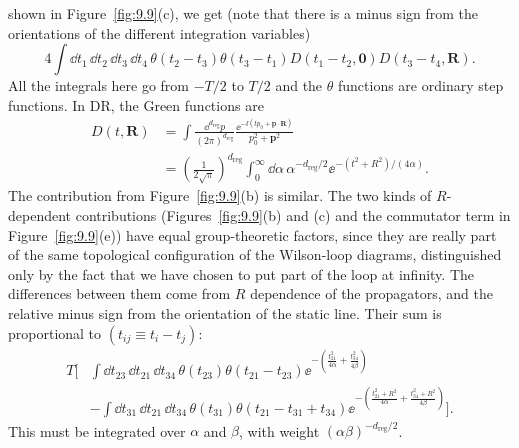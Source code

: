 shown in Figure~\ref{fig:9.9}(c), we get (note that there is a minus sign from
the orientations of the different integration variables)
\[
  4\int\dd t_1\,\dd t_2\,\dd t_3\,\dd t_4\,
  \theta(t_2-t_3)\theta(t_3-t_1)D(t_1-t_2,\mathbf 0)D(t_3-t_4,\mathbf R).
\]
All the integrals here go from $-T/2$ to $T/2$ and the $\theta$ functions are
ordinary step functions. In DR, the Green functions are
\[
\begin{aligned}
  D(t,\mathbf R)&=\int\frac{\dd^{d_{\mathrm{reg}}}p}{(2\pi)^{d_{\mathrm{reg}}}}
  \frac{\ee^{-\ii(tp_0+\mathbf p\cdot\mathbf R)}}{p_0^2+\mathbf p^2}\\
  &=\left(\frac{1}{2\sqrt\pi}\right)^{d_{\mathrm{reg}}}
  \int_0^\infty\dd\alpha\,\alpha^{-d_{\mathrm{reg}}/2}
  \ee^{-(t^2+R^2)/(4\alpha)}.
\end{aligned}
\]
The contribution from Figure~\ref{fig:9.9}(b) is similar. The two kinds of
$R$-dependent contributions (Figures~\ref{fig:9.9}(b) and (c) and the
commutator term in Figure~\ref{fig:9.9}(e)) have equal group-theoretic factors,
since they are really part of the same topological configuration of the
Wilson-loop diagrams, distinguished only by the fact that we have chosen to
put part of the loop at infinity. The differences between them come from
$R$ dependence of the propagators, and the relative minus sign from the
orientation of the static line. Their sum is proportional to
$(t_{ij}\equiv t_i-t_j)$:
\[
\begin{aligned}
T\Big[&\int\dd t_{23}\,\dd t_{21}\,\dd t_{34}\,
 \theta(t_{23})\theta(t_{21}-t_{23})
 \ee^{-\left(\frac{t_{21}^2}{4\alpha}+\frac{t_{34}^2}{4\beta}\right)}\\
&-\int\dd t_{31}\,\dd t_{21}\,\dd t_{34}\,
 \theta(t_{31})\theta(t_{21}-t_{31}+t_{34})
 \ee^{-\left(\frac{t_{21}^2+R^2}{4\alpha}
             +\frac{t_{34}^2+R^2}{4\beta}\right)}\Big].
\end{aligned}
\]
This must be integrated over $\alpha$ and $\beta$, with weight
$(\alpha\beta)^{-d_{\mathrm{reg}}/2}$.

